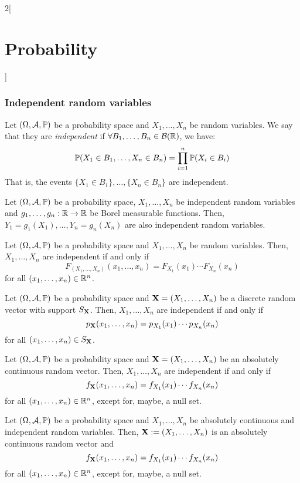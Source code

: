 \documentclass[../../../main.tex]{subfiles}
\begin{document}
\begin{multicols}{2}[\section{Probability}]
  \subsubsection{Independent random variables}
  \begin{definition}
    Let $(\Omega,\mathcal{A},\mathbb{P})$ be a probability space and $X_1,\ldots,X_n$ be random variables. We say that they are \textit{independent} if $\forall B_1,\ldots,B_n\in\mathcal{B}(\mathbb{R})$, we have: $$\mathbb{P}(X_1\in B_1,\ldots,X_n\in B_n)=\prod_{i=1}^n\mathbb{P}(X_i\in B_i)$$ That is, the events $\{X_1\in B_1\},\ldots,\{X_n\in B_n\}$ are independent.
  \end{definition}
  \begin{prop}
    Let $(\Omega,\mathcal{A},\mathbb{P})$ be a probability space, $X_1,\ldots,X_n$ be independent random variables and $g_1,\ldots,g_n:\mathbb{R}\rightarrow\mathbb{R}$ be Borel measurable functions. Then, $Y_1=g_1(X_1),\ldots,Y_n=g_n(X_n)$ are also independent random variables.
  \end{prop}
  \begin{prop}
    Let $(\Omega,\mathcal{A},\mathbb{P})$ be a probability space and $X_1,\ldots,X_n$ be random variables. Then, $X_1,\ldots,X_n$ are independent if and only if $$F_{(X_1,\ldots,X_n)}(x_1,\ldots,x_n)=F_{X_1}(x_1)\cdots F_{X_n}(x_n)$$ for all $(x_1,\ldots,x_n)\in\mathbb{R}^n$.
  \end{prop}
  \begin{prop}
    Let $(\Omega,\mathcal{A},\mathbb{P})$ be a probability space and $\boldsymbol{\mathrm{X}}=(X_1,\ldots,X_n)$ be a discrete random vector with support $S_{\boldsymbol{\mathrm{X}}}$. Then, $X_1,\ldots,X_n$ are independent if and only if $$p_{\boldsymbol{\mathrm{X}}}(x_1,\ldots,x_n)=p_{X_1}(x_1)\cdots p_{X_n}(x_n)$$ for all $(x_1,\ldots,x_n)\in S_{\boldsymbol{\mathrm{X}}}$.
  \end{prop}
  \begin{prop}
    Let $(\Omega,\mathcal{A},\mathbb{P})$ be a probability space and $\boldsymbol{\mathrm{X}}=(X_1,\ldots,X_n)$ be an absolutely continuous random vector. Then, $X_1,\ldots,X_n$ are independent if and only if $$f_{\boldsymbol{\mathrm{X}}}(x_1,\ldots,x_n)=f_{X_1}(x_1)\cdots f_{X_n}(x_n)$$ for all $(x_1,\ldots,x_n)\in \mathbb{R}^n$, except for, maybe, a null set.
  \end{prop}
  \begin{prop}
    Let $(\Omega,\mathcal{A},\mathbb{P})$ be a probability space and $X_1,\ldots,X_n$ be absolutely continuous and independent random variables. Then, $\boldsymbol{\mathrm{X}}:=(X_1,\ldots,X_n)$ is an absolutely continuous random vector and $$f_{\boldsymbol{\mathrm{X}}}(x_1,\ldots,x_n)=f_{X_1}(x_1)\cdots f_{X_n}(x_n)$$ for all $(x_1,\ldots,x_n)\in \mathbb{R}^n$, except for, maybe, a null set.
  \end{prop}

\end{multicols}
\end{document}

